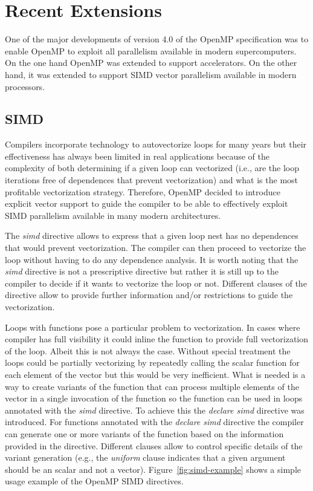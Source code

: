\section{Recent Extensions}
\label{sec:recent_extensions}

One of the major developments of version 4.0 of the OpenMP specification was to
enable OpenMP to exploit all parallelism available in modern supercomputers. On
the one hand OpenMP was extended to support accelerators. On the other hand, it
was extended to support SIMD vector parallelism available in modern processors. 

\subsection{SIMD}
\label{sub:simd}

Compilers incorporate technology to autovectorize loops for many years but their
effectiveness has always been limited in real applications because of the
complexity of both determining if a given loop can vectorized (i.e., are the
loop iterations free of dependences that prevent vectorization) and what is the
most profitable vectorization strategy. Therefore, OpenMP decided to introduce
explicit vector support to guide the compiler to be able to effectively exploit
SIMD parallelism available in many modern architectures.

The \emph{simd} directive allows to express that a given loop nest has no
dependences that would prevent vectorization. The compiler can then proceed to
vectorize the loop without having to do any dependence analysis. It is worth
noting that the \emph{simd} directive is not a prescriptive directive but rather
it is still up to the compiler to decide if it wants to vectorize the loop or
not. Different clauses of the directive allow to provide further information
and/or restrictions to guide the vectorization.

Loops with functions pose a particular problem to vectorization. In cases where
compiler has full visibility it could inline the function to provide full
vectorization of the loop. Albeit this is not always the case. Without special
treatment the loops could be partially vectorizing by repeatedly calling the
scalar function for each element of the vector but this would be very
inefficient. What is needed is a way to create variants of the function that can
process multiple elements of the vector in a single invocation of the function
so the function can be used in loops annotated with the \emph{simd} directive.
To achieve this the \emph{declare simd} directive was introduced. For functions
annotated with the \emph{declare simd} directive the compiler can generate one
or more variants of the function based on the information provided in the
directive. Different clauses allow to control specific details of the variant
generation (e.g., the \emph{uniform} clause indicates that a given argument
should be an scalar and not a vector). Figure~\ref{fig:simd-example} shows
a simple usage example of the OpenMP SIMD directives.

